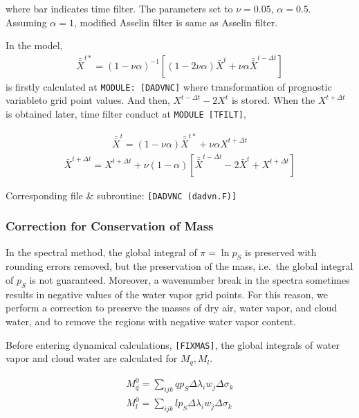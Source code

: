 where bar indicates time filter. The parameters set to \(\nu=0.05\),
\(\alpha=0.5\). Assuming \(\alpha=1\), modified Asselin filter is same
as Asselin filter.

In the model, \begin{eqnarray}
 \bar{\bar{X}}^{t*} = (1-\nu\alpha)^{-1}[(1-2\nu\alpha)\bar{X}^t +\nu\alpha \bar{\bar{X}}^{t-\Delta t} ]
\end{eqnarray} is firstly calculated at \texttt{MODULE:\ {[}DADVNC{]}} where
transformation of prognostic variableto grid point values. And then,
\(X^{t-\Delta t}-2X^t\) is stored. When the \(X^{t+\Delta t}\) is
obtained later, time filter conduct at \texttt{MODULE\ {[}TFILT{]}},

\begin{eqnarray}
 \bar{\bar{X}}^{t} = (1-\nu\alpha)\bar{\bar{X}}^{t*} +\nu\alpha X^{t+\Delta t}
\end{eqnarray} \begin{eqnarray}
\bar{X}^{t+\Delta t} = X^{t+\Delta t} + \nu (1-\alpha)[ \bar{\bar{X}}^{t-\Delta t} - 2\bar{X}^{t} + X^{t+\Delta t}]
 \end{eqnarray}

Corresponding file \& subroutine: \texttt{{[}DADVNC\ (dadvn.F){]}}

\hypertarget{correction-for-conservation-of-mass}{%
\subsubsection{Correction for Conservation of
Mass}\label{correction-for-conservation-of-mass}}

In the spectral method, the global integral of \(\pi = \ln p_S\) is
preserved with rounding errors removed, but the preservation of the
mass, i.e.~the global integral of \(p_S\) is not guaranteed. Moreover, a
wavenumber break in the spectra sometimes results in negative values of
the water vapor grid points. For this reason, we perform a correction to
preserve the masses of dry air, water vapor, and cloud water, and to
remove the regions with negative water vapor content.

Before entering dynamical calculations, \texttt{{[}FIXMAS{]}}, the
global integrals of water vapor and cloud water are calculated for
\(M_q, M_l\).

\begin{eqnarray}
  M_q^0  =  \sum_{ijk} q p_S  \Delta\lambda_i w_j \Delta\sigma_k  \\
  M_l^0  =  \sum_{ijk} l p_S  \Delta\lambda_i w_j \Delta\sigma_k
\end{eqnarray}

